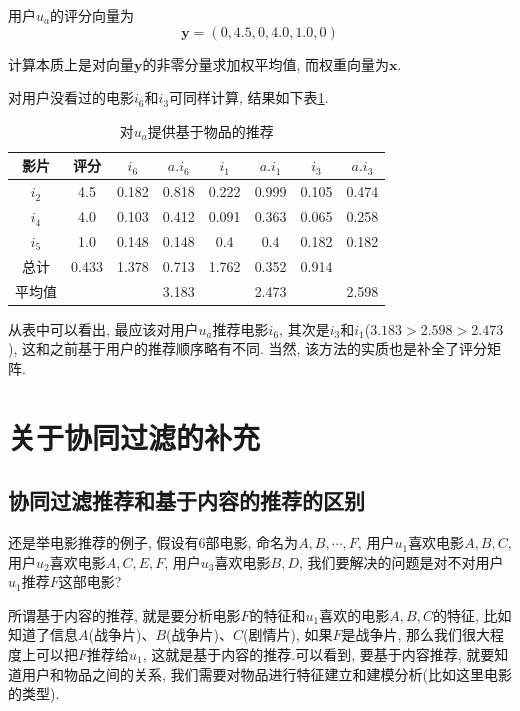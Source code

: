 \documentclass[a4paper,UTF8]{ctexart}
\theoremstyle{plain} \newtheorem{theorem}{定理}[section]
\theoremstyle{plain} \newtheorem{definition}{定义}[section]
\theoremstyle{plain} \newtheorem{lemma}{引理}[section]
\theoremstyle{plain} \newtheorem{proposition}{命题}[section]
\theoremstyle{plain} \newtheorem{example}{例}[section]
\theoremstyle{plain} \newtheorem{remark}{注}[section]
\theoremstyle{plain} \newtheorem{corollary}{推论}[section]
\begin{document}
用户$u_a$的评分向量为
\begin{equation*}
\bm{y} = (0, 4.5, 0, 4.0, 1.0, 0)
\end{equation*}

计算本质上是对向量$\bm{y}$的非零分量求加权平均值, 而权重向量为$\bm{x}$.

对用户没看过的电影$i_6$和$i_3$可同样计算, 结果如下表\ref{itemua}.
\begin{table}[!htb]
\centering
\caption{对$u_a$提供基于物品的推荐}
\label{itemua}
\begin{tabular}{c|c|c|c|c|c|c|c}
	\hline
    影片 & 评分 & $i_6$ & $a.i_6$ & $i_1$ & $a.i_1$ & $i_3$ & $a.i_3$ \\
    \hline
    $i_2$ & 4.5 & 0.182 & 0.818 & 0.222 & 0.999 & 0.105 & 0.474 \\
    \hline
    $i_4$ & 4.0 & 0.103 & 0.412 & 0.091 & 0.363 & 0.065 & 0.258 \\
    \hline
    $i_5$ & 1.0 & 0.148 & 0.148 & 0.4   & 0.4   & 0.182 & 0.182 \\
    \hline
    总计   & 0.433 & 1.378 & 0.713 & 1.762 & 0.352 & 0.914 \\ 
    \hline 
    平均值  &  &  & 3.183 &  & 2.473  &  & 2.598 \\ 
	\hline
\end{tabular}
\end{table}

从表中可以看出, 最应该对用户$u_a$推荐电影$i_6$, 其次是$i_3$和$i_1$($3.183 > 2.598 > 2.473$), 这和之前基于用户的推荐顺序略有不同. 当然, 该方法的实质也是补全了评分矩阵.





\section{关于协同过滤的补充}
\subsection{协同过滤推荐和基于内容的推荐的区别}
还是举电影推荐的例子, 假设有$6$部电影, 命名为$A,B,\cdots,F$, 用户$u_{1}$喜欢电影$A,B,C$, 用户$u_{2}$喜欢电影$A,C,E,F$, 用户$u_{3}$喜欢电影$B,D$, 我们要解决的问题是对不对用户$u_{1}$推荐$F$这部电影?

所谓基于内容的推荐, 就是要分析电影$F$的特征和$u_{1}$喜欢的电影$A,B,C$的特征, 比如知道了信息$A$(战争片)、$B$(战争片)、$C$(剧情片), 如果$F$是战争片, 那么我们很大程度上可以把$F$推荐给$u_{1}$, 这就是基于内容的推荐.可以看到, 要基于内容推荐, 就要知道用户和物品之间的关系, 我们需要对物品进行特征建立和建模分析(比如这里电影的类型).
\end{document}
